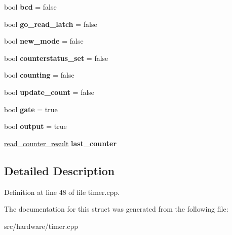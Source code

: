 \begin{DoxyCompactItemize}
\item 
\hypertarget{structPIT__Block_a8ddc522280bb994ea634aa855470836e}{bool {\bfseries bcd} = false}\label{structPIT__Block_a8ddc522280bb994ea634aa855470836e}

\item 
\hypertarget{structPIT__Block_a7a715f03e1acc563935446865c6ff565}{bool {\bfseries go\-\_\-read\-\_\-latch} = false}\label{structPIT__Block_a7a715f03e1acc563935446865c6ff565}

\item 
\hypertarget{structPIT__Block_acf24bddaa36c23e46f27c9b7127707a3}{bool {\bfseries new\-\_\-mode} = false}\label{structPIT__Block_acf24bddaa36c23e46f27c9b7127707a3}

\item 
\hypertarget{structPIT__Block_a048abc116ac6c60acfc407a6274a69ae}{bool {\bfseries counterstatus\-\_\-set} = false}\label{structPIT__Block_a048abc116ac6c60acfc407a6274a69ae}

\item 
\hypertarget{structPIT__Block_a22b10292f287bf33a2c5b456dce9bddc}{bool {\bfseries counting} = false}\label{structPIT__Block_a22b10292f287bf33a2c5b456dce9bddc}

\item 
\hypertarget{structPIT__Block_a81813382e0d2d0d1c79cf97713ae68df}{bool {\bfseries update\-\_\-count} = false}\label{structPIT__Block_a81813382e0d2d0d1c79cf97713ae68df}

\item 
\hypertarget{structPIT__Block_a4207ed587f5c51acadcbea33ef324368}{bool {\bfseries gate} = true}\label{structPIT__Block_a4207ed587f5c51acadcbea33ef324368}

\item 
\hypertarget{structPIT__Block_aba70d7b051f82e064e7da0193f225e43}{bool {\bfseries output} = true}\label{structPIT__Block_aba70d7b051f82e064e7da0193f225e43}

\item 
\hypertarget{structPIT__Block_aa531b7f189242b699b2655b1069b2527}{\hyperlink{structPIT__Block_1_1read__counter__result}{read\-\_\-counter\-\_\-result} {\bfseries last\-\_\-counter}}\label{structPIT__Block_aa531b7f189242b699b2655b1069b2527}

\end{DoxyCompactItemize}


\subsection{Detailed Description}


Definition at line 48 of file timer.\-cpp.



The documentation for this struct was generated from the following file\-:\begin{DoxyCompactItemize}
\item 
src/hardware/timer.\-cpp\end{DoxyCompactItemize}
